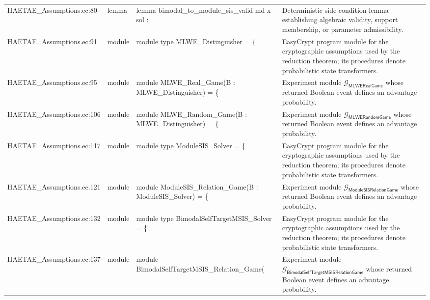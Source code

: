 \documentclass[10pt]{article}
\begin{document}
\begin{longtable}{L{0.11\textwidth}L{0.055\textwidth}L{0.385\textwidth}L{0.41\textwidth}}
HAETAE\_\allowbreak{}Assumptions.\allowbreak{}ec:\allowbreak{}80 & lemma & {\ttfamily\scriptsize lemma bimodal\_\allowbreak{}to\_\allowbreak{}module\_\allowbreak{}sis\_\allowbreak{}valid md x sol :} & Deterministic side-condition lemma establishing algebraic validity, support membership, or parameter admissibility. \\
HAETAE\_\allowbreak{}Assumptions.\allowbreak{}ec:\allowbreak{}91 & module & {\ttfamily\scriptsize module type MLWE\_\allowbreak{}Distinguisher = \{} & EasyCrypt program module for the cryptographic assumptions used by the reduction theorem; its procedures denote probabilistic state transformers. \\
HAETAE\_\allowbreak{}Assumptions.\allowbreak{}ec:\allowbreak{}95 & module & {\ttfamily\scriptsize module MLWE\_\allowbreak{}Real\_\allowbreak{}Game(B : MLWE\_\allowbreak{}Distinguisher) = \{} & Experiment module $\mathcal G_{\mathsf{MLWERealGame}}$ whose returned Boolean event defines an advantage probability. \\
HAETAE\_\allowbreak{}Assumptions.\allowbreak{}ec:\allowbreak{}106 & module & {\ttfamily\scriptsize module MLWE\_\allowbreak{}Random\_\allowbreak{}Game(B : MLWE\_\allowbreak{}Distinguisher) = \{} & Experiment module $\mathcal G_{\mathsf{MLWERandomGame}}$ whose returned Boolean event defines an advantage probability. \\
HAETAE\_\allowbreak{}Assumptions.\allowbreak{}ec:\allowbreak{}117 & module & {\ttfamily\scriptsize module type ModuleSIS\_\allowbreak{}Solver = \{} & EasyCrypt program module for the cryptographic assumptions used by the reduction theorem; its procedures denote probabilistic state transformers. \\
HAETAE\_\allowbreak{}Assumptions.\allowbreak{}ec:\allowbreak{}121 & module & {\ttfamily\scriptsize module ModuleSIS\_\allowbreak{}Relation\_\allowbreak{}Game(B : ModuleSIS\_\allowbreak{}Solver) = \{} & Experiment module $\mathcal G_{\mathsf{ModuleSISRelationGame}}$ whose returned Boolean event defines an advantage probability. \\
HAETAE\_\allowbreak{}Assumptions.\allowbreak{}ec:\allowbreak{}132 & module & {\ttfamily\scriptsize module type BimodalSelfTargetMSIS\_\allowbreak{}Solver = \{} & EasyCrypt program module for the cryptographic assumptions used by the reduction theorem; its procedures denote probabilistic state transformers. \\
HAETAE\_\allowbreak{}Assumptions.\allowbreak{}ec:\allowbreak{}137 & module & {\ttfamily\scriptsize module BimodalSelfTargetMSIS\_\allowbreak{}Relation\_\allowbreak{}Game(} & Experiment module $\mathcal G_{\mathsf{BimodalSelfTargetMSISRelationGame}}$ whose returned Boolean event defines an advantage probability. \\

\end{longtable}
\end{document}
